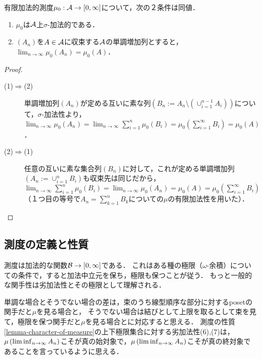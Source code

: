 \documentclass[uplatex, dvipdfmx]{jsreport}
\begin{document}
\begin{lemma}\label{lemma-sigma-additivity-of-finitely-additive-measure-in-terms-of-monotone-sequence}
    有限加法的測度$\mu_0:\mathcal{A}\to[0,\infty]$について，次の２条件は同値．
    \begin{enumerate}
        \item $\mu_0$は$\mathcal{A}$上$\sigma$-加法的である．
        \item $(A_n)$を$A\in\mathcal{A}$に収束する$\mathcal{A}$の単調増加列とすると，$\lim_{n\to\infty}\mu_0(A_n)=\mu_0(A)$．
    \end{enumerate}
\end{lemma}
\begin{proof}\mbox{}
    \begin{description}
        \item[(1)$\Rightarrow$(2)] 単調増加列$(A_n)$が定める互いに素な列$(B_n:=A_n\setminus(\cup_{i=1}^{n-1}A_i))$について，$\sigma$-加法性より，$\lim_{n\to\infty}\mu_0(A_n)=\lim_{n\to\infty}\sum^n_{i=1}\mu_0(B_i)=\mu_0(\sum^\infty_{i=1}B_i)=\mu_0(A)$．
        \item[(2)$\Rightarrow$(1)] 任意の互いに素な集合列$(B_n)$に対して，これが定める単調増加列$(A_n:=\cup_{i=1}^nB_i)$も収束先は同じだから，$\lim_{n\to\infty}\sum^n_{i=1}\mu_0(B_i)=\lim_{n\to\infty}\mu_0(A_n)=\mu_0(A)=\mu_0(\sum^\infty_{i=1}B_i)$（１つ目の等号で$A_n=\sum_{k=1}^nB_k$についての$\mu$の有限加法性を用いた）．
    \end{description}
\end{proof}

\subsection{測度の定義と性質}

\begin{tcolorbox}[colframe=ForestGreen, colback=ForestGreen!10!white,breakable,colbacktitle=ForestGreen!40!white,coltitle=black,fonttitle=\bfseries\sffamily,
title=]
    測度は加法的な関数$\mathcal{B}\to[0,\infty]$である．
    これはある種の極限（$\omega$-余積）についての条件で，すると加法中立元を保ち，極限も保つことが従う．
    もっと一般的な関手性は劣加法性とその極限として理解される．

    単調な場合とそうでない場合の差は，束のうち線型順序な部分に対するposetの関手だと$\mu$を見る場合と，
    そうでない場合は結びとして上限を取るとして束を見て，極限を保つ関手だと$\mu$を見る場合とに対応すると思える．
    測度の性質\ref{lemma-character-of-measure}の上下極限集合に対する劣加法性(6),(7)は，$\mu\left(\liminf_{n\to\infty}A_n\right)$こそが真の始対象で，$\mu\left(\liminf_{n\to\infty}A_n\right)$こそが真の終対象であることを言っているように思える．
\end{tcolorbox}
\end{document}
